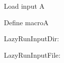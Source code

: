 Load input A

Define macroA

LazyRunInputDir: \LazyRunInputDir

LazyRunInputFile: \LazyRunInputFile

\newcommand{\macroA}{Macro A}


